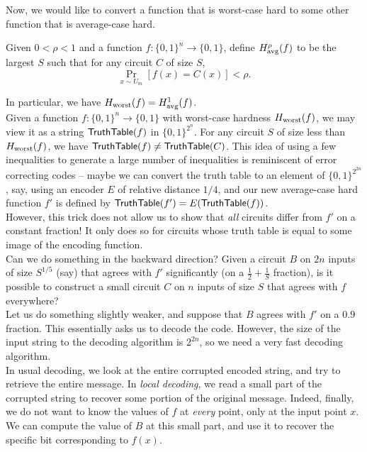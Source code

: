		Now, we would like to convert a function that is worst-case hard to some other function that is average-case hard.

		\begin{fdef}
			Given $0 < \rho < 1$ and a function $f : \{0,1\}^n \to \{0,1\}$, define $H_{\text{avg}}^\rho(f)$ to be the largest $S$ such that for any circuit $C$ of size $S$,
			\[ \Pr_{x \sim U_m} [f(x) = C(x)] < \rho. \]
		\end{fdef}

		In particular, we have $H_{\text{worst}}(f) = H_{\text{avg}}^1(f)$.\\

		Given a function $f : \{0,1\}^n \to \{0,1\}$ with worst-case hardness $H_{\text{worst}}(f)$, we may view it as a string $\mathsf{TruthTable}(f)$ in $\{0,1\}^{2^n}$. For any circuit $S$ of size less than $H_{\text{worst}}(f)$, we have $\mathsf{TruthTable}(f) \ne \mathsf{TruthTable}(C)$. This idea of using a few inequalities to generate a large number of inequalities is reminiscent of error correcting codes -- maybe we can convert the truth table to an element of $\{0,1\}^{2^{2n}}$, say, using an encoder $E$ of relative distance $1/4$, and our new average-case hard function $f'$ is defined by $\mathsf{TruthTable}(f') = E(\mathsf{TruthTable}(f))$.\\
		However, this trick does not allow us to show that \emph{all} circuits differ from $f'$ on a constant fraction! It only does so for circuits whose truth table is equal to some image of the encoding function. \\
		Can we do something in the backward direction? Given a circuit $B$ on $2n$ inputs of size $S^{1/5}$ (say) that agrees with $f'$ significantly (on a $\frac{1}{2} + \frac{1}{S}$ fraction), is it possible to construct a small circuit $C$ on $n$ inputs of size $S$ that agrees with $f$ everywhere?\\

		Let us do something slightly weaker, and suppose that $B$ agrees with $f'$ on a $0.9$ fraction. This essentially asks us to decode the code. However, the size of the input string to the decoding algorithm is $2^{2n}$, so we need a very fast decoding algorithm.\\
		In usual decoding, we look at the entire corrupted encoded string, and try to retrieve the entire message. In \emph{local decoding}, we read a small part of the corrupted string to recover some portion of the original message. Indeed, finally, we do not want to know the values of $f$ at \emph{every} point, only at the input point $x$.\\
		We can compute the value of $B$ at this small part, and use it to recover the specific bit corresponding to $f(x)$.

